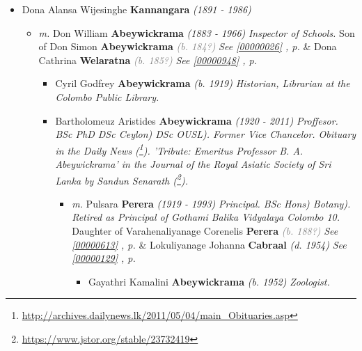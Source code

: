 \documentclass[10pt, openany]{book}
\begin{document}
\begin{itemize}
{\begin{itemize}
{\begin{itemize}
{\begin{itemize}
\end{itemize}}
\end{itemize}
    }
\item{Dona Alansa Wijesinghe \textbf{Kannangara} \textcolor{slorange}{\textit{(1891 - 1986)}}
\begin{itemize}
\item{\textit{m.} Don William \textbf{Abeywickrama} \textcolor{slorange}{\textit{(1883 - 1966)}} \textcolor{slmaroon}{\textit{Inspector of Schools.}} Son of  Don Simon \textbf{Abeywickrama} \textcolor{gray}{\textit{(b. 184?)}} \textcolor{slteal}{\textit{See  \autoref{00000026} \textit{, p. \pageref{00000026} }}}  \&  Dona Cathrina \textbf{Welaratna} \textcolor{gray}{\textit{(b. 185?)}} \textcolor{slteal}{\textit{See  \autoref{00000948} \textit{, p. \pageref{00000948} }}}   \label{couple:00000028:00000411} \begin{itemize}
\item{Cyril Godfrey \textbf{Abeywickrama} \textcolor{slorange}{\textit{(b. 1919)}} \textcolor{slmaroon}{\textit{Historian, Librarian at the Colombo Public Library.}}
  }
\item{Bartholomeuz Aristides \textbf{Abeywickrama} \textcolor{slorange}{\textit{(1920 - 2011)}} \textcolor{slmaroon}{\textit{Proffesor.
BSc PhD DSc Ceylon) DSc OUSL).
Former Vice Chancelor.
Obituary in the Daily News (\footnote{\url{http://archives.dailynews.lk/2011/05/04/main_Obituaries.asp}}).
'Tribute: Emeritus Professor B. A. Abeywickrama' in the Journal of the Royal Asiatic Society of Sri Lanka by Sandun Senarath (\footnote{\url{https://www.jstor.org/stable/23732419}}).}}
\begin{itemize}
\item{\textit{m.} Pulsara \textbf{Perera} \textcolor{slorange}{\textit{(1919 - 1993)}} \textcolor{slmaroon}{\textit{Principal.
BSc Hons) Botany).
Retired as Principal of Gothami Balika Vidyalaya Colombo 10.}} Daughter of  Varahenaliyanage Corenelis \textbf{Perera} \textcolor{gray}{\textit{(b. 188?)}} \textcolor{slteal}{\textit{See  \autoref{00000613} \textit{, p. \pageref{00000613} }}}  \&  Lokuliyanage Johanna \textbf{Cabraal} \textcolor{slorange}{\textit{(d. 1954)}} \textcolor{slteal}{\textit{See  \autoref{00000129} \textit{, p. \pageref{00000129} }}}   \label{couple:00000018:00000607} \begin{itemize}
\item{Gayathri Kamalini \textbf{Abeywickrama} \textcolor{slorange}{\textit{(b. 1952)}} \textcolor{slmaroon}{\textit{Zoologist.}}
}
\end{itemize}}
\end{itemize}}
\end{itemize}}
\end{itemize}}
\end{itemize}}
\end{itemize}
\end{document}
